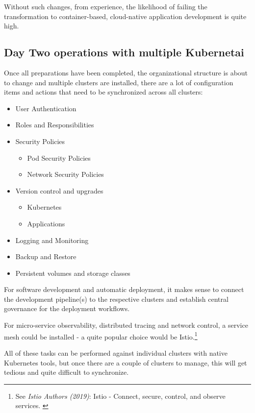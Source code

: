 Without such changes, from experience, the likelihood of failing the transformation to container-based, cloud-native application development is quite high.

\subsection{Day Two operations with multiple Kubernetai}

Once all preparations have been completed, the organizational structure is about to change and multiple clusters are installed, there are a lot of configuration items and actions that need to be synchronized across all clusters:

\begin{itemize}
\item User Authentication
\item Roles and Responsibilities
\item Security Policies
    \begin{itemize}
    \item Pod Security Policies
    \item Network Security Policies
    \end{itemize}
\item Version control and upgrades
    \begin{itemize}
    \item Kubernetes
    \item Applications
    \end{itemize}
\item Logging and Monitoring
\item Backup and Restore
\item Persistent volumes and storage classes
\end{itemize}

For software development and automatic deployment, it makes sense to connect the development pipeline(s) to the respective clusters and establish central governance for the deployment workflows.

For micro-service observability, distributed tracing and network control, a service mesh could be installed - a quite popular choice would be Istio.\footnote{See \textit{Istio Authors (2019)}: Istio - Connect, secure, control, and observe services. \cite{istio}}

All of these tasks can be performed against individual clusters with native Kubernetes tools, but once there are a couple of clusters to manage, this will get tedious and quite difficult to synchronize.

